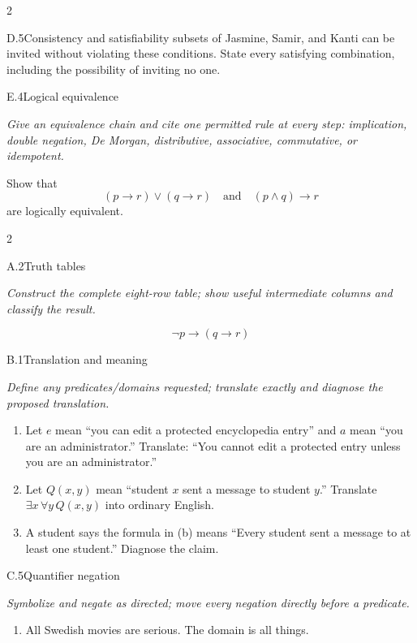 \documentclass[9pt]{extarticle}
\begin{document}
\begin{multicols}{2}
\begin{CoreProblem}{D.5}{Consistency and satisfiability}
subsets of Jasmine, Samir, and Kanti can be invited without violating these
conditions. State every satisfying combination, including the possibility of
inviting no one.
\end{CoreProblem}
\begin{CoreProblem}{E.4}{Logical equivalence}
{\scriptsize\textit{Give an equivalence chain and cite one permitted rule at every step: implication, double negation, De Morgan, distributive, associative, commutative, or idempotent.}\par}
Show that
\[
  (p\to r)\lor(q\to r)
  \quad\text{and}\quad
  (p\land q)\to r
\]
are logically equivalent.
\end{CoreProblem}
\end{multicols}
\CoreWorkArea
\FormBreak
{}
\begin{multicols}{2}
\begin{CoreProblem}{A.2}{Truth tables}
{\scriptsize\textit{Construct the complete eight-row table; show useful intermediate columns and classify the result.}\par}
\[
  \neg p\to(q\to r)
\]
\end{CoreProblem}
\begin{CoreProblem}{B.1}{Translation and meaning}
{\scriptsize\textit{Define any predicates/domains requested; translate exactly and diagnose the proposed translation.}\par}
\begin{enumerate}[label=(\alph*)]
  \item Let $e$ mean ``you can edit a protected encyclopedia entry'' and $a$
        mean ``you are an administrator.'' Translate: ``You cannot edit a
        protected entry unless you are an administrator.''
  \item Let $Q(x,y)$ mean ``student $x$ sent a message to student $y$.''
        Translate $\exists x\,\forall y\,Q(x,y)$ into ordinary English.
  \item A student says the formula in (b) means ``Every student sent a message
        to at least one student.'' Diagnose the claim.
\end{enumerate}
\end{CoreProblem}
\begin{CoreProblem}{C.5}{Quantifier negation}
{\scriptsize\textit{Symbolize and negate as directed; move every negation directly before a predicate.}\par}
\begin{enumerate}[label=(\alph*)]
  \item All Swedish movies are serious. The domain is all things.

\end{enumerate}
\end{CoreProblem}
\end{multicols}
\end{document}
